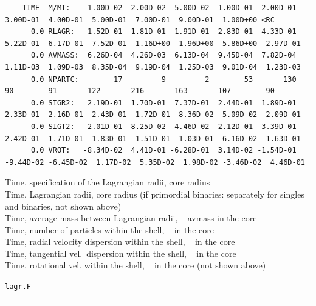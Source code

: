 \begin{landscape}
\vspace{1ex}
\noindent
\begin{minipage}[t]{18cm}
{\tiny
\begin{verbatim}
    TIME  M/MT:    1.00D-02  2.00D-02  5.00D-02  1.00D-01  2.00D-01  3.00D-01  4.00D-01  5.00D-01  7.00D-01  9.00D-01  1.00D+00 <RC
      0.0 RLAGR:   1.52D-01  1.81D-01  1.91D-01  2.83D-01  4.33D-01  5.22D-01  6.17D-01  7.52D-01  1.16D+00  1.96D+00  5.86D+00  2.97D-01
      0.0 AVMASS:  6.26D-04  4.26D-03  6.13D-04  9.45D-04  7.82D-04  1.11D-03  1.09D-03  8.35D-04  9.19D-04  1.25D-03  9.01D-04  1.23D-03
      0.0 NPARTC:        17         9         2        53       130        90        91       122       216       163       107        90
      0.0 SIGR2:   2.19D-01  1.70D-01  7.37D-01  2.44D-01  1.89D-01  2.33D-01  2.16D-01  2.43D-01  1.72D-01  8.36D-02  5.09D-02  2.09D-01
      0.0 SIGT2:   2.01D-01  8.25D-02  4.46D-02  2.12D-01  3.39D-01  2.42D-01  1.71D-01  1.83D-01  1.51D-01  1.03D-01  6.16D-02  1.63D-01
      0.0 VROT:   -8.34D-02  4.41D-01 -6.28D-01  3.14D-02 -1.54D-01 -9.44D-02 -6.45D-02  1.17D-02  5.35D-02  1.98D-02 -3.46D-02  4.46D-01
\end{verbatim}
}
Time, specification of the Lagrangian radii, core radius\\
Time, Lagrangian radii, core radius (if primordial binaries: separately
 for singles and binaries, not shown above)\\
Time, average mass between Lagrangian radii, ~ avmass in the core\\
Time, number of particles within the shell, ~ in the core\\
Time, radial velocity dispersion within the shell, ~ in the core\\
Time, tangential vel.~dispersion within the shell, ~ in the core\\
Time, rotational vel. within the shell, ~ in the core (not shown above)\\
\end{minipage} \hfill
%
\begin{minipage}{4.5cm}
\begin{center}
{\tt lagr.F}
\end{center}
\end{minipage}

\vspace{2ex}
\noindent
\hrule



\end{landscape}

